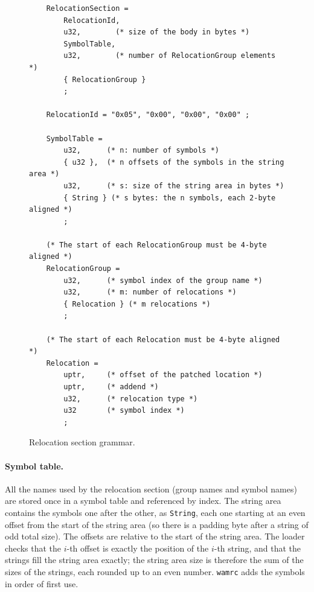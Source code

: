 \documentclass{article}
\begin{document}
\begin{figure}[H]
\begin{verbatim}
    RelocationSection =
        RelocationId,
        u32,        (* size of the body in bytes *)
        SymbolTable,
        u32,        (* number of RelocationGroup elements *)
        { RelocationGroup }
        ;

    RelocationId = "0x05", "0x00", "0x00", "0x00" ;

    SymbolTable =
        u32,      (* n: number of symbols *)
        { u32 },  (* n offsets of the symbols in the string area *)
        u32,      (* s: size of the string area in bytes *)
        { String } (* s bytes: the n symbols, each 2-byte aligned *)
        ;

    (* The start of each RelocationGroup must be 4-byte aligned *)
    RelocationGroup =
        u32,      (* symbol index of the group name *)
        u32,      (* m: number of relocations *)
        { Relocation } (* m relocations *)
        ;

    (* The start of each Relocation must be 4-byte aligned *)
    Relocation =
        uptr,     (* offset of the patched location *)
        uptr,     (* addend *)
        u32,      (* relocation type *)
        u32       (* symbol index *)
        ;
\end{verbatim}
\caption{Relocation section grammar.}
\label{fig:relocation-section-grammar}
\end{figure}

\paragraph{Symbol table.}
All the names used by the relocation section (group names and symbol names) are stored once in a symbol table and referenced by index.
The string area contains the symbols one after the other, as \verb|String|, each one starting at an even offset from the start of the string area (so there is a padding byte after a string of odd total size).
The offsets are relative to the start of the string area.
The loader checks that the $i$-th offset is exactly the position of the $i$-th string, and that the strings fill the string area exactly; the string area size is therefore the sum of the sizes of the strings, each rounded up to an even number.
\texttt{wamrc} adds the symbols in order of first use.
\end{document}
